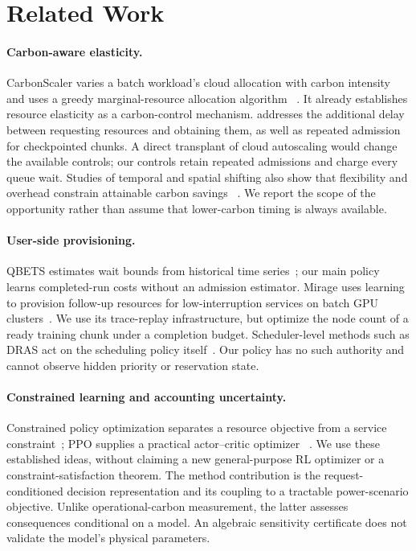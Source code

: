 \section{Related Work}

\paragraph{Carbon-aware elasticity.}
CarbonScaler varies a batch workload's cloud allocation with carbon intensity
and uses a greedy marginal-resource allocation algorithm
~\cite{hanafy2023carbonscaler}. It already establishes resource elasticity as a
carbon-control mechanism. \name{} addresses the additional delay between
requesting resources and obtaining them, as well as repeated admission for
checkpointed chunks. A direct transplant of cloud autoscaling would change
the available controls; our controls retain repeated admissions and charge every queue wait. Studies of temporal and spatial shifting
also show that flexibility and overhead constrain attainable carbon savings
~\cite{sukprasert2024limitations}. We report the scope of the opportunity rather
than assume that lower-carbon timing is always available.

\paragraph{User-side provisioning.}
QBETS estimates wait bounds from historical time series~\cite{nurmi2007qbets};
our main policy learns completed-run costs without an admission estimator.
Mirage uses learning to provision follow-up resources for low-interruption
services on batch GPU clusters~\cite{ding2023mirage}. We use its trace-replay
infrastructure, but optimize the node count of a ready training chunk under a
completion budget. Scheduler-level methods such as DRAS act on the scheduling
policy itself~\cite{fan2021deep}. Our policy has no such authority and cannot
observe hidden priority or reservation state.

\paragraph{Constrained learning and accounting uncertainty.}
Constrained policy optimization separates a resource objective from a service
constraint~\cite{achiam2017cpo}; PPO supplies a practical actor--critic optimizer
~\cite{schulman2017ppo}. We use these established ideas, without claiming a new
general-purpose RL optimizer or a constraint-satisfaction theorem. The method
contribution is the request-conditioned decision representation and its
coupling to a tractable power-scenario objective. Unlike operational-carbon
measurement, the latter assesses consequences conditional on a model. An
algebraic sensitivity certificate does not validate the model's physical
parameters.
